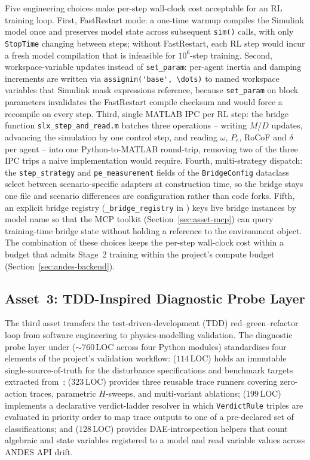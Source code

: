 \documentclass{unnc-fyp}
\begin{document}
Five engineering choices make per-step wall-clock cost acceptable
for an RL training loop.
First, FastRestart mode: a one-time warmup compiles the Simulink
model once and preserves model state across subsequent
\verb|sim()| calls, with only \verb|StopTime| changing between
steps; without FastRestart, each RL step would incur a fresh
model compilation that is infeasible for $10^{6}$-step training.
Second, workspace-variable updates instead of \verb|set_param|:
per-agent inertia and damping increments are written via
\verb|assignin('base', \dots)| to named workspace variables that
Simulink mask expressions reference, because \verb|set_param| on
block parameters invalidates the FastRestart compile checksum
and would force a recompile on every step.
Third, single MATLAB IPC per RL step: the bridge function
\verb|slx_step_and_read.m| batches three operations -- writing
$M$/$D$ updates, advancing the simulation by one control step,
and reading $\omega$, $P_e$, RoCoF and $\delta$ per agent --
into one Python-to-MATLAB round-trip, removing two of the three
IPC trips a naive implementation would require.
Fourth, multi-strategy dispatch: the \verb|step_strategy| and
\verb|pe_measurement| fields of the \verb|BridgeConfig|
dataclass select between scenario-specific adapters at
construction time, so the bridge stays one file and scenario
differences are configuration rather than code forks.
Fifth, an explicit bridge registry
(\verb|_bridge_registry| in ) keys live
bridge instances by model name so that the MCP toolkit
(Section~\ref{sec:asset-mcp}) can query training-time bridge
state without holding a reference to the environment object.
The combination of these choices keeps the per-step wall-clock
cost within a budget that admits Stage~2 training within the
project's compute budget (Section~\ref{sec:andes-backend}).

\subsection{Asset~3: TDD-Inspired Diagnostic Probe Layer}
\label{sec:asset-tdd-probes}

The third asset transfers the test-driven-development (TDD)
red--green--refactor loop from software engineering to
physics-modelling validation.
The diagnostic probe layer under 
($\sim\!760$\,LOC across four Python modules) standardises four
elements of the project's validation workflow:
 ($114$\,LOC) holds an immutable
single-source-of-truth for the disturbance specifications and
benchmark targets extracted from~\cite{yang2023ddic};
 ($323$\,LOC) provides three reusable trace
runners covering zero-action traces, parametric $H$-sweeps, and
multi-variant ablations;  ($199$\,LOC)
implements a declarative verdict-ladder resolver in which
\verb|VerdictRule| triples are evaluated in priority order to
map trace outputs to one of a pre-declared set of
classifications; and  ($128$\,LOC) provides
DAE-introspection helpers that count algebraic and state
variables registered to a model and read variable values across
ANDES API drift.
\end{document}
